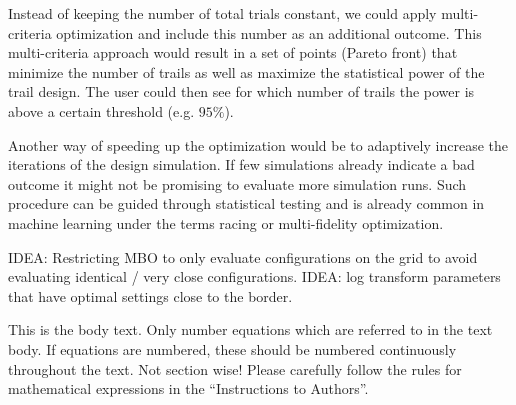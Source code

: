 \documentclass[bimj,fleqn]{w-art}
\theoremstyle{plain}
\theoremstyle{definition}
\begin{document}

Instead of keeping the number of total trials constant, we could apply multi-criteria optimization and include this number as an additional outcome.
This multi-criteria approach would result in a set of points (Pareto front) that minimize the number of trails as well as maximize the statistical power of the trail design.
The user could then see for which number of trails the power is above a certain threshold (e.g. $95\%$).

Another way of speeding up the optimization would be to adaptively increase the iterations of the design simulation. 
If few simulations already indicate a bad outcome it might not be promising to evaluate more simulation runs.
Such procedure can be guided through statistical testing and is already common in machine learning under the terms racing or multi-fidelity optimization.

IDEA: Restricting MBO to only evaluate configurations on the grid to avoid evaluating identical / very close configurations.
IDEA: log transform parameters that have optimal settings close to the border.


\noindent This is the body text. Only number equations which are referred to in the text body. If equations
are numbered, these should be numbered continuously throughout the text. Not section wise! Please
carefully follow the rules for mathematical expressions in the ``Instructions to Authors''.
\end{document}
